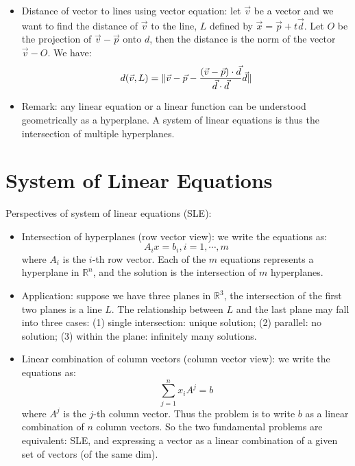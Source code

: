 \documentclass{report}
\begin{document}
\begin{itemize}
\item Distance of vector to lines using vector equation: let $\vec{v}$ be a vector and we want to find the distance of $\vec{v}$ to the line, $L$ defined by $\vec{x} = \vec{p} + t \vec{d}$. Let $O$ be the projection of $\vec{v}-\vec{p}$ onto $d$, then the distance is the norm of the vector $\vec{v} - O$. We have: 
\begin{equation}
d(\vec{v}, L)	= \lVert\vec{v}-\vec{p} - \frac{(\vec{v}-\vec{p}) \cdot \vec{d}}{\vec{d} \cdot \vec{d}} \vec{d}\rVert
\end{equation}

\item Remark: any linear equation or a linear function can be understood geometrically as a hyperplane. A system of linear equations is thus the intersection of multiple hyperplanes. 
\end{itemize}

\section{System of Linear Equations}

Perspectives of system of linear equations (SLE): 
\begin{itemize}
\item Intersection of hyperplanes (row vector view): we write the equations as: 
\begin{equation}
A_i x = b_i, i = 1, \cdots, m	
\end{equation}
where $A_i$ is the $i$-th row vector. Each of the $m$ equations represents a hyperplane in $\mathbb{R}^n$, and the solution is the intersection of $m$ hyperplanes. 

\item Application: suppose we have three planes in $\mathbb{R}^3$, the intersection of the first two planes is a line $L$. The relationship between $L$ and the last plane may fall into three cases: (1) single intersection: unique solution; (2) parallel: no solution; (3) within the plane: infinitely many solutions. 

\item Linear combination of column vectors (column vector view): we write the equations as: 
\begin{equation}
\sum_{j=1}^n x_i A^j = b	
\end{equation}
where $A^j$ is the $j$-th column vector. Thus the problem is to write $b$ as a linear combination of $n$ column vectors. So the two fundamental problems are equivalent: SLE, and expressing a vector as a linear combination of a given set of vectors (of the same dim). 
\end{itemize}
\end{document}
